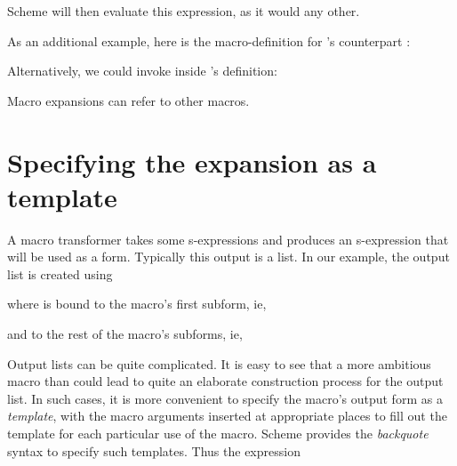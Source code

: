 
\n Scheme will then evaluate this expression, as it
  would any other.


As an additional example, here is the macro-definition
for 's counterpart :


\n Alternatively, we could invoke  inside
  's definition:


\n Macro expansions can refer to other macros.

\section{Specifying the expansion as a template}

A macro transformer takes some s-expressions and
produces an s-expression that will be used as a form.
Typically this output is a list.  In our
 example, the output list is created using


\n where  is bound to the macro's first
  subform, ie,


\n and  to the rest of the macro's subforms,
ie,



\n 
Output lists can be quite complicated.  It is easy to
see that a more ambitious macro than  could
lead to quite an elaborate construction process for the
output list.  In such cases, it is more convenient to
specify the macro's output form as a {\em template},
with the macro arguments inserted at appropriate places
to fill out the template for each particular use of the
macro.  Scheme provides the {\em backquote} syntax to
specify such templates.    Thus the expression

